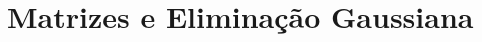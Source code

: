 \documentclass[11pt, openany]{book}
\begin{document}
\maketitle

\frontmatter

\tableofcontents

\mainmatter

\chapter{Matrizes e Eliminação Gaussiana}




\end{document}
